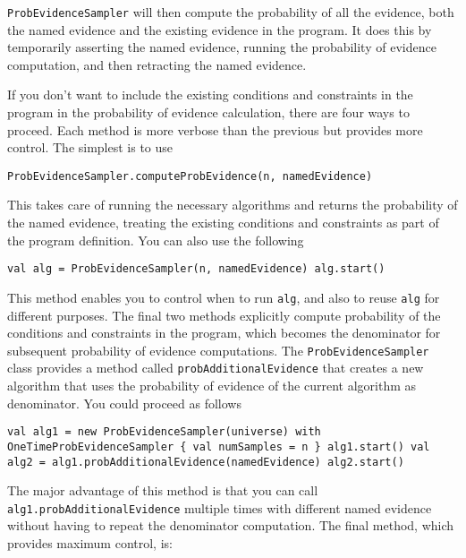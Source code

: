 \texttt{ProbEvidenceSampler} will then compute the probability of all the evidence, both the named evidence and the existing evidence in the program. It does this by temporarily asserting the named evidence, running the probability of evidence computation, and then retracting the named evidence.

If you don't want to include the existing conditions and constraints in the program in the probability of evidence calculation, there are four ways to proceed. Each method is more verbose than the previous but provides more control. The simplest is to use

\begin{flushleft}
\texttt{ProbEvidenceSampler.computeProbEvidence(n, namedEvidence)}
\end{flushleft}

This takes care of running the necessary algorithms and returns the probability of the named evidence, treating the existing conditions and constraints as part of the program definition. You can also use the following

\begin{flushleft}
\texttt{val alg = ProbEvidenceSampler(n, namedEvidence)
\newline alg.start()
}
\end{flushleft}

This method enables you to control when to run \texttt{alg}, and also to reuse \texttt{alg} for different purposes. The final two methods explicitly compute probability of the conditions and constraints in the program, which becomes the denominator for subsequent probability of evidence computations. The \texttt{ProbEvidenceSampler} class provides a method called \texttt{probAdditionalEvidence} that creates a new algorithm that uses the probability of evidence of the current algorithm as denominator. You could proceed as follows

\begin{flushleft}
\texttt{val alg1 = new ProbEvidenceSampler(universe) with
\newline \tab OneTimeProbEvidenceSampler \{ val numSamples = n \}
\newline alg1.start()
\newline val alg2 = alg1.probAdditionalEvidence(namedEvidence)
\newline alg2.start()
}
\end{flushleft}

The major advantage of this method is that you can call \texttt{alg1.prob\-AdditionalEvidence} multiple times with different named evidence without having to repeat the denominator computation. The final method, which provides maximum control, is:

